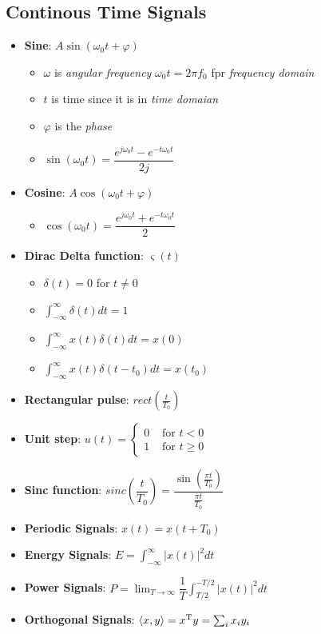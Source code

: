 \documentclass{article}
\begin{document}
\subsection{Continous Time Signals}
\begin{itemize}
    \item \textbf{Sine}: $A\sin(\omega_0t+\varphi)$
    \begin{itemize}
        \item $\omega$ is \textit{angular frequency} $\omega_0t=2\pi f_0$ fpr \textit{frequency domain}
        \item $t$ is time since it is in \textit{time domaian}
        \item $\varphi$ is the \textit{phase}
        \item $\sin(\omega_0t)=\dfrac{e^{j\omega_0t}-e^{-t\omega_0t}}{2j}$
    \end{itemize}
    \item \textbf{Cosine}: $A\cos(\omega_0t+\varphi)$
    \begin{itemize}
        \item $\cos(\omega_0t)=\dfrac{e^{j\omega_0t}+e^{-t\omega_0t}}{2}$
    \end{itemize}
    \item \textbf{Dirac Delta function}: $\varsigma(t)$
    \begin{itemize}
        \item $\delta(t)=0$ for $t\neq 0$
        \item $\int_{-\infty}^{\infty}\delta(t)dt=1$
        \item $\int_{-\infty}^{\infty} x(t)\delta(t)dt=x(0)$
        \item $\int_{-\infty}^{\infty} x(t)\delta(t-t_0)dt=x(t_0)$
    \end{itemize}
    \item \textbf{Rectangular pulse}: $rect(\frac{t}{T_0})$
    \item \textbf{Unit step}: $u(t)=\left\{\begin{array}{ll}0 & \text { for } t<0 \\ 1 & \text { for } t \geq 0\end{array}\right.$%
    \item \textbf{Sinc function}: $sinc(\dfrac{t}{T_0})=\dfrac{\sin(\frac{\pi t}{T_0})}{\frac{\pi t}{T_0}}$
    \item \textbf{Periodic Signals}: $x(t)=x(t+T_0)$
    \item \textbf{Energy Signals}: $E=\int_{-\infty}^{\infty}|x(t)|^2dt$
    \item \textbf{Power Signals}: $P=\lim_{T\to\infty}\dfrac{1}{T}\int_{T/2}^{-T/2}|x(t)|^2dt$
    \item \textbf{Orthogonal Signals}: $\langle x,y \rangle = x^{\mathrm{T}} y = \sum_i x_i y_i$
\end{itemize}
\end{document}
